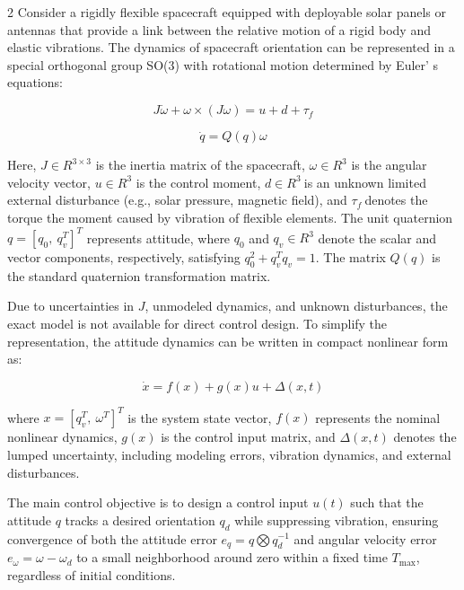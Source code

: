 \begin{multicols}{2}
Consider a rigidly flexible spacecraft equipped with deployable solar
panels or antennas that provide a link between the relative motion of a
rigid body and elastic vibrations. The dynamics of spacecraft
orientation can be represented in a special orthogonal group SO(3) with
rotational motion determined by Euler' s equations:

\begin{equation*}
J\dot{\omega} + \omega \times (J\omega) = u + d + \tau_{f}
\end{equation*}

\begin{equation}
\dot{q} = Q(q)\omega
\end{equation}

Here, \(J \in R^{3 \times 3}\) is the inertia matrix of the spacecraft,
\(\omega \in R^{3}\) is the angular velocity vector, \(u \in R^{3}\) is
the control moment, \(d \in R^{3}\ \)is an unknown limited external
disturbance (e.g., solar pressure, magnetic field), and
\(\tau_{f}\ \)denotes the torque the moment caused by vibration of
flexible elements. The unit quaternion
\(q = \left\lbrack q_{0},\ q_{v}^{Τ} \right\rbrack^{Τ}\) represents
attitude, where \(q_{0}\) and \(q_{v} \in R^{3}\) denote the scalar and
vector components, respectively, satisfying
\(q_{0}^{2} + q_{v}^{Τ}q_{v} = 1\). The matrix \(Q(q)\) is the standard
quaternion transformation matrix.

Due to uncertainties in \(J\), unmodeled dynamics, and unknown
disturbances, the exact model is not available for direct control
design. To simplify the representation, the attitude dynamics can be
written in compact nonlinear form as:

\begin{equation}
\dot{x} = f(x) + g(x)u + \Delta (x,t)
\end{equation}

where \(x = \left\lbrack q_{v}^{Τ},\ \omega^{Τ} \right\rbrack^{Τ}\) is
the system state vector, \(f(x)\) represents the nominal nonlinear
dynamics, \(g(x)\) is the control input matrix, and
\(\Delta (x,t)\) denotes the lumped uncertainty, including
modeling errors, vibration dynamics, and external disturbances.

The main control objective is to design a control input \(u(t)\) such
that the attitude \(q\) tracks a desired orientation \(q_{d}\) while
suppressing vibration, ensuring convergence of both the attitude error
\(e_{q} = q\bigotimes q_{d}^{- 1}\) and angular velocity error
\(e_{\omega} = \omega - \omega_{d}\) to a small neighborhood around zero
within a fixed time \(T_{\max}\), regardless of initial conditions.


\end{multicols}
